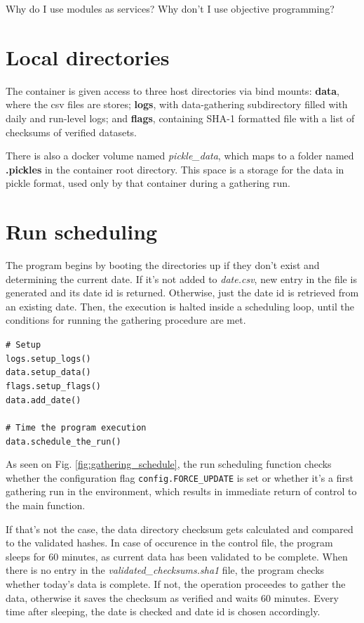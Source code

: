 Why do I use modules as services? Why don't I use objective programming?


\section{Local directories}
The container is given access to three host directories via bind mounts: \textbf{data}, where the csv files are stores; \textbf{logs}, with data-gathering subdirectory filled with daily and run-level logs; and \textbf{flags}, containing SHA-1 formatted file with a list of checksums of verified datasets. \par
There is also a docker volume named \textit{pickle\_data}, which maps to a folder named \textbf{.pickles} in the container root directory. This space is a storage for the data in pickle format, used only by that container during a gathering run.

\section{Run scheduling}
The program begins by booting the directories up if they don't exist and determining the current date. If it's not added to \textit{date.csv}, new entry in the file is generated and its date id is returned. Otherwise, just the date id is retrieved from an existing date. Then, the execution is halted inside a scheduling loop, until the conditions for running the gathering procedure are met. \par \noindent
\texttt{\# Setup \\ logs.setup\_logs() \\ data.setup\_data() \\ flags.setup\_flags() \\ data.add\_date() \\ \\ \# Time the program execution \\ data.schedule\_the\_run()}

As seen on Fig. \ref{fig:gathering_schedule}, the run scheduling function checks whether the configuration flag \linebreak \texttt{config.FORCE\_UPDATE} is set or whether it's a first gathering run in the environment, which results in immediate return of control to the main function. \par
If that's not the case, the data directory checksum gets calculated and compared to the validated hashes. In case of occurence in the control file, the program sleeps for 60 minutes, as current data has been validated to be complete. When there is no entry in the \textit{validated\_checksums.sha1} file, the program checks whether today's data is complete. If not, the operation proceedes to gather the data, otherwise it saves the checksum as verified and waits 60 minutes. Every time after sleeping, the date is checked and date id is chosen accordingly.

